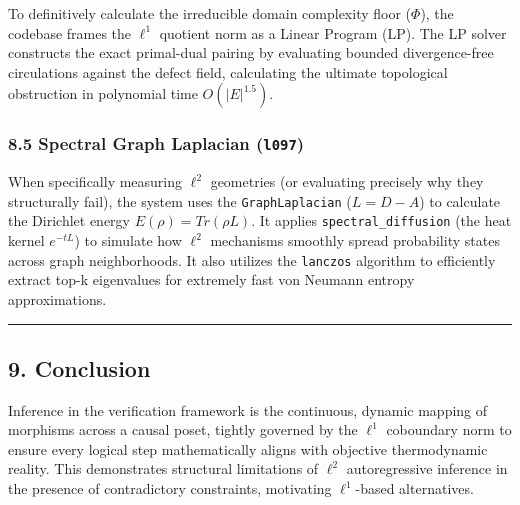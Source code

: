 \documentclass[
]{article}
\begin{document}
To definitively calculate the irreducible domain complexity floor
(\(\Phi\)), the codebase frames the \(\ell^1\) quotient norm as a Linear
Program (LP). The LP solver constructs the exact primal-dual pairing by
evaluating bounded divergence-free circulations against the defect
field, calculating the ultimate topological obstruction in polynomial
time \(O(|E|^{1.5})\).

\subsubsection{\texorpdfstring{8.5 Spectral Graph Laplacian
(\texttt{l097})}{8.5 Spectral Graph Laplacian (l097)}}\label{spectral-graph-laplacian-l097}

When specifically measuring \(\ell^2\) geometries (or evaluating
precisely why they structurally fail), the system uses the
\texttt{GraphLaplacian} (\(L = D - A\)) to calculate the Dirichlet
energy \(E(\rho) = Tr(\rho L)\). It applies \texttt{spectral\_diffusion}
(the heat kernel \(e^{-tL}\)) to simulate how \(\ell^2\) mechanisms
smoothly spread probability states across graph neighborhoods. It also
utilizes the \texttt{lanczos} algorithm to efficiently extract top-k
eigenvalues for extremely fast von Neumann entropy approximations.

\begin{center}\rule{0.5\linewidth}{0.5pt}\end{center}

\subsection{9. Conclusion}\label{conclusion}

Inference in the verification framework is the continuous, dynamic
mapping of morphisms across a causal poset, tightly governed by the
\(\ell^1\) coboundary norm to ensure every logical step mathematically
aligns with objective thermodynamic reality. This demonstrates
structural limitations of \(\ell^2\) autoregressive inference in the
presence of contradictory constraints, motivating \(\ell^1\)-based
alternatives.
\end{document}
